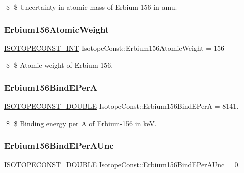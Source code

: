 \$ \$ Uncertainty in atomic mass of Erbium-\/156 in amu. \mbox{\label{group___isotope_const-_erbium-_er156_gad259b09c265b657d4b9ae513dbf3f300}} 
\subsubsection{\texorpdfstring{Erbium156\+Atomic\+Weight}{Erbium156AtomicWeight}}
{\footnotesize\ttfamily \mbox{\hyperlink{group___isotope_const-_macros_ga5f18360b3e99483a35c32d789e62621c}{I\+S\+O\+T\+O\+P\+E\+C\+O\+N\+S\+T\+\_\+\+I\+NT}} Isotope\+Const\+::\+Erbium156\+Atomic\+Weight = 156}

\$ \$ Atomic weight of Erbium-\/156. \mbox{\label{group___isotope_const-_erbium-_er156_ga6ff15e9a1a77ccd6cf4bf28be44c9af3}} 
\subsubsection{\texorpdfstring{Erbium156\+Bind\+E\+PerA}{Erbium156BindEPerA}}
{\footnotesize\ttfamily \mbox{\hyperlink{group___isotope_const-_macros_ga8f45a7272ce02c0b4c65c44636ed719a}{I\+S\+O\+T\+O\+P\+E\+C\+O\+N\+S\+T\+\_\+\+D\+O\+U\+B\+LE}} Isotope\+Const\+::\+Erbium156\+Bind\+E\+PerA = 8141.}

\$ \$ Binding energy per A of Erbium-\/156 in keV. \mbox{\label{group___isotope_const-_erbium-_er156_ga8a97a5364e79be11627b2a83eebdf378}} 
\subsubsection{\texorpdfstring{Erbium156\+Bind\+E\+Per\+A\+Unc}{Erbium156BindEPerAUnc}}
{\footnotesize\ttfamily \mbox{\hyperlink{group___isotope_const-_macros_ga8f45a7272ce02c0b4c65c44636ed719a}{I\+S\+O\+T\+O\+P\+E\+C\+O\+N\+S\+T\+\_\+\+D\+O\+U\+B\+LE}} Isotope\+Const\+::\+Erbium156\+Bind\+E\+Per\+A\+Unc = 0.}

